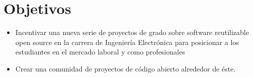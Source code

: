 \section{Objetivos}

\begin{itemize}
	\item Incentivar una nueva serie de proyectos de grado sobre software reutilizable
		open source en la carrera de Ingeniería Electrónica para posicionar a los estudiantes
		en el mercado laboral y como profesionales

	\item Crear una comunidad de proyectos de código abierto alrededor de éste.
\end{itemize}